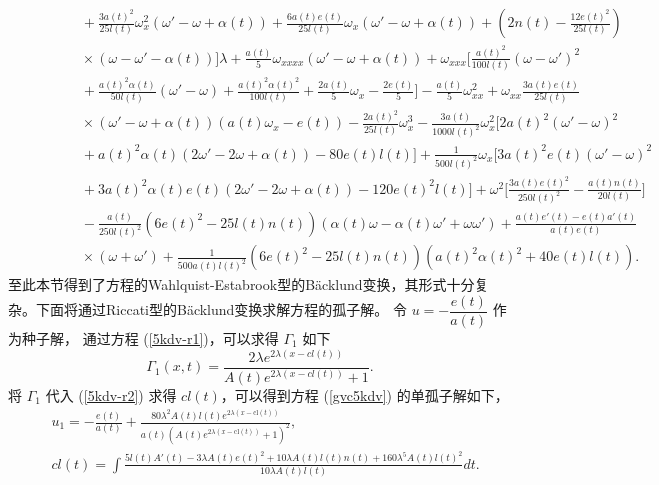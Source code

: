 \begin{align}
\nonumber
& \quad\quad\quad\quad
+ \frac{3 a(t)^2}{25 l(t)}\omega_x^2( \omega'- \omega+ \alpha(t)) + \frac{6 a(t) e(t)}{25 l(t)}\omega_x( \omega'- \omega+ \alpha(t)) + (2 n(t)-\frac{12 e(t)^2}{25 l(t)})
\\ \nonumber
& \quad\quad\quad\quad
\times (\omega- \omega'-\alpha(t)) \big] \lambda+ \frac{a(t)}{5}\omega_{xxxx}( \omega'- \omega+ \alpha(t)) + \omega_{xxx}\big[ \frac{a(t)^2}{100 l(t)}
(\omega- \omega')^2
\\ \nonumber
& \quad\quad\quad\quad
+ \frac{a(t)^2 \alpha(t) }{50 l(t)} ( \omega'- \omega) + \frac{a(t)^2 \alpha(t)^2}{100 l(t)}+\frac{2 a(t)}{5}\omega_x -\frac{2 e(t)}{5} \big] -\frac{a(t)}{5} \omega_{xx}^2+ \omega_{xx} \frac{3 a(t) e(t)}{25 l(t)}
\\ \nonumber
& \quad\quad\quad\quad
\times( \omega'- \omega+ \alpha(t)) (a(t) \omega_x -e(t))-\frac{2 a(t)^2}{25 l(t)}\omega_{x}^3-\frac{3 a(t)}{1000 l(t)^2}\omega_{x}^2 \big[ 2a(t)^2 ( \omega'- \omega)^2
\\ \nonumber
& \quad\quad\quad\quad
+ a(t)^2 \alpha(t) ( 2\omega'- 2\omega+ \alpha(t)) -80 e(t) l(t) \big]+ \frac{1}{500 l(t)^2} \omega_{x} \big[3 a(t)^2 e(t) ( \omega'- \omega)^2
\\ \nonumber
& \quad\quad\quad\quad
+3 a(t)^2 \alpha(t) e(t) (2 \omega'-2 \omega+\alpha(t))  -120 e(t)^2 l(t) \big]+ \omega^2\big[ \frac{3 a(t) e(t)^2}{250 l(t)^2}-\frac{a(t) n(t)}{20 l(t)}\big]
\\ \nonumber
& \quad\quad\quad\quad-\frac{a(t) }{250 l(t)^2}(6 e(t)^2-25 l(t) n(t)) (\alpha(t) \omega -\alpha(t) \omega'+\omega \omega' )+  \frac{a(t) e'(t)-e(t) a'(t)}{a(t) e(t)}
\\
&\quad\quad\quad\quad
\times(\omega +\omega' )+\frac{1}{500 a(t) l(t)^2}(6 e(t)^2-25 l(t) n(t)) (a(t)^2 \alpha(t)^2+40 e(t) l(t)).\label{5kdv-w8}
\end{align}
至此本节得到了方程的Wahlquist-Estabrook型的B\"{a}cklund变换，其形式十分复杂。下面将通过Riccati型的B\"{a}cklund变换求解方程的孤子解。
令 $u=-\dfrac{e(t)}{a(t)}$ 作为种子解， 通过方程 (\ref{5kdv-r1})，可以求得
$\Gamma_1$ 如下
\begin{equation}
\Gamma _1(x,t)=\frac{2 \lambda  e^{2 \lambda  \left(x-cl(t)\right)}}{A(t) e^{2 \lambda  \left(x-cl(t)\right)}+1}.\label{5kdv-lp10}
\end{equation}
将 $\Gamma _1$ 代入 (\ref{5kdv-r2}) 求得 $cl(t)$，可以得到方程 (\ref{gvc5kdv}) 的单孤子解如下，
\begin{align}
&u_1=-\frac{e(t)}{a(t)}+ \frac{80 \lambda ^2 A(t) l(t) e^{2 \lambda  (x-\text{cl}(t))}}{a(t) \left(A(t) e^{2 \lambda  (x-\text{cl}(t))}+1\right)^2}
,\label{5kdv-lp10-1}\\
&cl(t)=\int \frac{5 l(t) A'(t)-3 \lambda  A(t) e(t)^2+10 \lambda  A(t) l(t) n(t)+160 \lambda ^5 A(t) l(t)^2}{10 \lambda  A(t) l(t)} dt.
\end{align}


